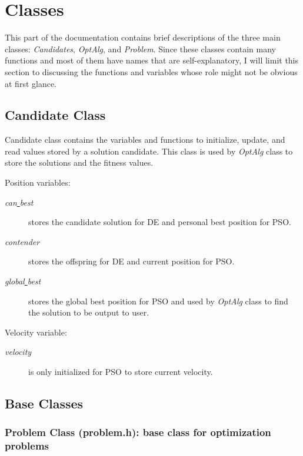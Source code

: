 \documentclass[12pt,letterpaper]{article}
\begin{document}
\section{Classes}

This part of the documentation contains brief descriptions of the three main classes: \textit{Candidates}, \textit{OptAlg}, and \textit{Problem}.
Since these classes contain many functions and most of them have names that are self-explanatory, I will limit this section to discussing the functions and variables whose role might not be obvious at first glance.

\subsection{Candidate Class}

Candidate class contains the variables and functions to initialize, update, and read values stored by a solution candidate.
This class is used by \textit{OptAlg} class to store the solutions and the fitness values.
 
\noindent Position variables:

\begin{description}
\item[\textit{can\underline{ }best}] stores the candidate solution for DE and personal best position for PSO.
\item[\textit{contender}] stores the offspring for DE and current position for PSO.
\item[\textit{global\underline{ }best}] stores the global best position for PSO and used by \textit{OptAlg} class to find the solution to be output to user.
\end{description}
       
\noindent Velocity variable:

\begin{description}
\item[\textit{velocity}] is only initialized for PSO to store current velocity.
\end{description} 

\subsection{Base Classes}

\subsubsection{Problem Class (problem.h): base class for optimization problems}
 
\end{document}
